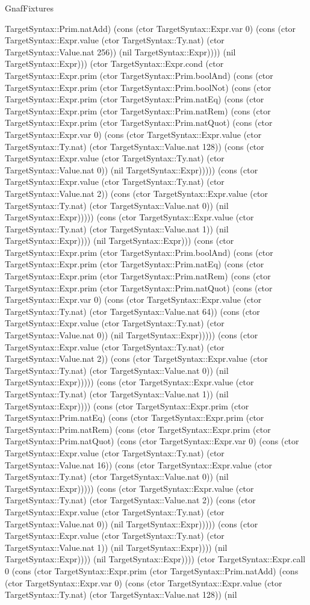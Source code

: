 \begin{lexlean}{GnafFixtures}
\begin{semanticmodule}
{TargetSyntax::Prim.natAdd) (cons (ctor TargetSyntax::Expr.var 0) (cons (ctor TargetSyntax::Expr.value (ctor TargetSyntax::Ty.nat) (ctor TargetSyntax::Value.nat 256)) (nil TargetSyntax::Expr)))) (nil TargetSyntax::Expr))) (ctor TargetSyntax::Expr.cond (ctor TargetSyntax::Expr.prim (ctor TargetSyntax::Prim.boolAnd) (cons (ctor TargetSyntax::Expr.prim (ctor TargetSyntax::Prim.boolNot) (cons (ctor TargetSyntax::Expr.prim (ctor TargetSyntax::Prim.natEq) (cons (ctor TargetSyntax::Expr.prim (ctor TargetSyntax::Prim.natRem) (cons (ctor TargetSyntax::Expr.prim (ctor TargetSyntax::Prim.natQuot) (cons (ctor TargetSyntax::Expr.var 0) (cons (ctor TargetSyntax::Expr.value (ctor TargetSyntax::Ty.nat) (ctor TargetSyntax::Value.nat 128)) (cons (ctor TargetSyntax::Expr.value (ctor TargetSyntax::Ty.nat) (ctor TargetSyntax::Value.nat 0)) (nil TargetSyntax::Expr))))) (cons (ctor TargetSyntax::Expr.value (ctor TargetSyntax::Ty.nat) (ctor TargetSyntax::Value.nat 2)) (cons (ctor TargetSyntax::Expr.value (ctor TargetSyntax::Ty.nat) (ctor TargetSyntax::Value.nat 0)) (nil TargetSyntax::Expr))))) (cons (ctor TargetSyntax::Expr.value (ctor TargetSyntax::Ty.nat) (ctor TargetSyntax::Value.nat 1)) (nil TargetSyntax::Expr)))) (nil TargetSyntax::Expr))) (cons (ctor TargetSyntax::Expr.prim (ctor TargetSyntax::Prim.boolAnd) (cons (ctor TargetSyntax::Expr.prim (ctor TargetSyntax::Prim.natEq) (cons (ctor TargetSyntax::Expr.prim (ctor TargetSyntax::Prim.natRem) (cons (ctor TargetSyntax::Expr.prim (ctor TargetSyntax::Prim.natQuot) (cons (ctor TargetSyntax::Expr.var 0) (cons (ctor TargetSyntax::Expr.value (ctor TargetSyntax::Ty.nat) (ctor TargetSyntax::Value.nat 64)) (cons (ctor TargetSyntax::Expr.value (ctor TargetSyntax::Ty.nat) (ctor TargetSyntax::Value.nat 0)) (nil TargetSyntax::Expr))))) (cons (ctor TargetSyntax::Expr.value (ctor TargetSyntax::Ty.nat) (ctor TargetSyntax::Value.nat 2)) (cons (ctor TargetSyntax::Expr.value (ctor TargetSyntax::Ty.nat) (ctor TargetSyntax::Value.nat 0)) (nil TargetSyntax::Expr))))) (cons (ctor TargetSyntax::Expr.value (ctor TargetSyntax::Ty.nat) (ctor TargetSyntax::Value.nat 1)) (nil TargetSyntax::Expr)))) (cons (ctor TargetSyntax::Expr.prim (ctor TargetSyntax::Prim.natEq) (cons (ctor TargetSyntax::Expr.prim (ctor TargetSyntax::Prim.natRem) (cons (ctor TargetSyntax::Expr.prim (ctor TargetSyntax::Prim.natQuot) (cons (ctor TargetSyntax::Expr.var 0) (cons (ctor TargetSyntax::Expr.value (ctor TargetSyntax::Ty.nat) (ctor TargetSyntax::Value.nat 16)) (cons (ctor TargetSyntax::Expr.value (ctor TargetSyntax::Ty.nat) (ctor TargetSyntax::Value.nat 0)) (nil TargetSyntax::Expr))))) (cons (ctor TargetSyntax::Expr.value (ctor TargetSyntax::Ty.nat) (ctor TargetSyntax::Value.nat 2)) (cons (ctor TargetSyntax::Expr.value (ctor TargetSyntax::Ty.nat) (ctor TargetSyntax::Value.nat 0)) (nil TargetSyntax::Expr))))) (cons (ctor TargetSyntax::Expr.value (ctor TargetSyntax::Ty.nat) (ctor TargetSyntax::Value.nat 1)) (nil TargetSyntax::Expr)))) (nil TargetSyntax::Expr)))) (nil TargetSyntax::Expr)))) (ctor TargetSyntax::Expr.call 0 (cons (ctor TargetSyntax::Expr.prim (ctor TargetSyntax::Prim.natAdd) (cons (ctor TargetSyntax::Expr.var 0) (cons (ctor TargetSyntax::Expr.value (ctor TargetSyntax::Ty.nat) (ctor TargetSyntax::Value.nat 128)) (nil }
\end{semanticmodule}
\end{lexlean}
